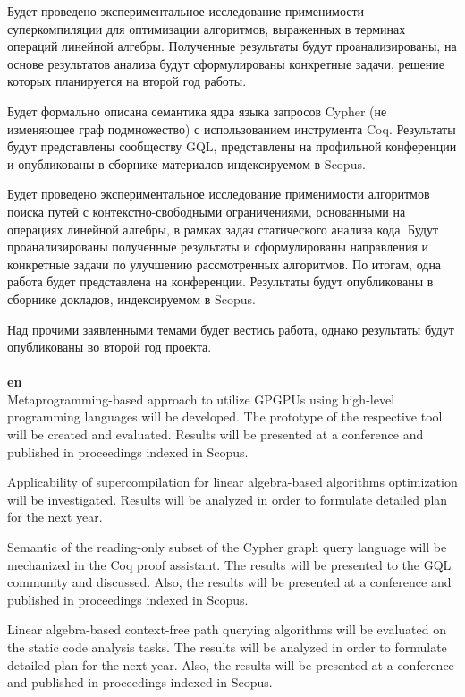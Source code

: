 \documentclass[12pt]{article}  %
\theoremstyle{remark}
\begin{document}
Будет проведено экспериментальное исследование применимости суперкомпиляции для оптимизации алгоритмов, выраженных в терминах операций линейной алгебры. Полученные результаты будут проанализированы, на основе результатов анализа будут сформулированы конкретные задачи, решение которых планируется на второй год работы.

Будет формально описана семантика ядра языка запросов Cypher (не изменяющее граф подмножество) с использованием инструмента Coq. Результаты будут представлены сообществу GQL, представлены на профильной конференции и опубликованы в сборнике материалов индексируемом в Scopus. 

Будет проведено экспериментальное исследование применимости алгоритмов поиска путей с контекстно-свободными ограничениями, основанными на операциях линейной алгебры, в рамках задач статического анализа кода. Будут проанализированы полученные результаты и сформулированы направления и конкретные задачи по улучшению рассмотренных алгоритмов. По итогам, одна работа будет представлена на конференции. Результаты будут опубликованы в сборнике докладов, индексируемом в Scopus.

Над прочими заявленными темами будет вестись работа, однако результаты будут опубликованы во второй год проекта.
\\
\\
\textbf{en}\\

Metaprogramming-based approach to utilize GPGPUs using high-level programming languages will be developed. The prototype of the respective tool will be created and evaluated. Results will be presented at a conference and published in proceedings indexed in Scopus.

Applicability of supercompilation for linear algebra-based algorithms optimization will be investigated. Results will be analyzed in order to formulate detailed plan for the next year. 

Semantic of the reading-only subset of the Cypher graph query language will be mechanized in the Coq proof assistant. The results will be presented to the GQL community and discussed. Also, the results will be presented at a conference and published in proceedings indexed in Scopus.

Linear algebra-based context-free path querying algorithms will be evaluated on the static code analysis tasks. The results will be analyzed in order to formulate detailed plan for the next year. Also, the results will be presented at a conference and published in proceedings indexed in Scopus.
\end{document}
